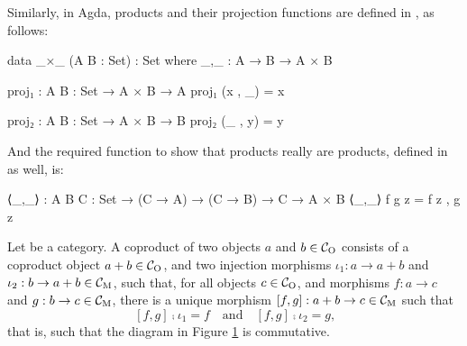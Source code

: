\begin{example}
  \label{ex:product-agda}


  Similarly, in Agda, products and their projection functions are
  defined in , as follows:
  \begin{codeagda}
data _×_ (A B : Set) : Set where
  _,_ : A → B → A × B

proj₁ : {A B : Set} → A × B → A
proj₁ (x , _) = x

proj₂ : {A B : Set} → A × B → B
proj₂ (_ , y) = y
  \end{codeagda}
  And the required function to show that products really are products,
  defined in  as well, is:
  \begin{codeagda}
⟨_,_⟩ : {A B C : Set} → (C → A) → (C → B) → C → A × B
⟨_,_⟩ f g z = f z , g z
  \end{codeagda}

\end{example}

\begin{definition}
  [Coproduct]


  \label{def:coproduct}


  Let  be a category. A coproduct of two objects $a$ and $b \in
  \mathcal{C}_{\operatorname{O}}$ consists of a coproduct object $a + b \in \mathcal{C}_{\operatorname{O}}$, and
  two injection morphisms $\iota_{1}: a \to a + b$ and $\iota_{2}: b
  \to a + b \in \mathcal{C}_{\operatorname{M}}$, such that, for all objects $c \in
  \mathcal{C}_{\operatorname{O}}$, and morphisms $f: a \to c$ and $g: b \to c \in \mathcal{C}_{\operatorname{M}}$,
  there is a unique morphism $[f,g]: a + b \to c \in \mathcal{C}_{\operatorname{M}}$ such
  that
  \begin{equation}
    \label{eq:coproduct}
    [f,g] \comp \iota_{1} = f
    \quad
    \text{and}
    \quad
    [f,g] \comp \iota_{2} = g
    \text{,}
  \end{equation}
  that is, such that the diagram in Figure \ref{fig:coproduct} is
  commutative.
  \begin{figure}[htbp]
    \begin{center}
    \end{center}
    \caption{}
    \label{fig:coproduct}
  \end{figure}

\end{definition}

